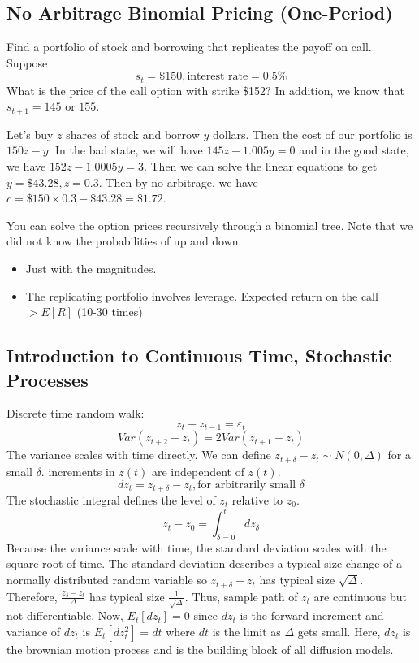 \documentclass[11pt, a4paper, oneside]{article}
\theoremstyle{definition}
\theoremstyle{proposition}
\theoremstyle{corollary}
\theoremstyle{lemma}
\theoremstyle{theorem}
\begin{document}
 \subsection{No Arbitrage Binomial Pricing (One-Period)}
 Find a portfolio of stock and borrowing that replicates the payoff on call. 
 Suppose 
 $$s_t = \$150, \text{interest rate} = 0.5\%$$
 What is the price of the call option with strike \$152? In addition, we know that $s_{t+1} = 145 \text{ or } 155$. 
 
 Let's buy $z$ shares of stock and borrow $y$ dollars. Then the cost of our portfolio is $150z - y$. In the bad state, we will have $145 z - 1.005 y = 0$ and in the good state, we have $152z - 1.0005 y = 3$. Then we can solve the linear equations to get $y = \$43.28, z = 0.3$. Then by no arbitrage, we have $c = \$150\times 0.3 - \$43.28 = \$1.72$. 
 
You can solve the option prices recursively through a binomial tree. Note that we did not know the probabilities of up and down.
\begin{itemize}
\item Just with the magnitudes. 
\item The replicating portfolio involves leverage. Expected return on the call $> E[R]$ (10-30 times)
\end{itemize}

\subsection{Introduction to Continuous Time, Stochastic Processes}
 Discrete time random walk:
 $$z_t - z_{t -1} = \varepsilon_t$$
 $$Var(z_{t+2} - z_t) = 2Var(z_{t+1} - z_t)$$
 The variance scales with time directly. We can define $z_{t+\delta} - z_t \sim N(0, \Delta)$ for a small $\delta$. increments in $z(t)$ are independent of $z(t)$. 
 $$dz_t = z_{t+\delta} - z_t, \text{for arbitrarily small } \delta$$ The stochastic integral defines the level of $z_t$ relative to $z_0$.
 $$z_t - z_0 = \int_{\delta=0}^t dz_{\delta}$$
 Because the variance scale with time, the standard deviation scales with the square root of time. The standard deviation describes a typical size change of a normally distributed random variable so $z_{t+\delta} - z_t$ has typical size $\sqrt{\Delta}$. Therefore, $\frac{z_{\delta} -z_t} {\Delta}$ has typical size $\frac{1}{\sqrt{\Delta} }$. Thus, sample path of $z_t$ are continuous but not differentiable. Now, $E_t[d z_t] = 0$ since $dz_t$ is the forward increment and variance of $dz_t$ is $E_t[dz_t^2] = dt$ where $dt$ is the limit as $\Delta$ gets small. Here, $dz_t$ is the brownian motion process and is the building block of all diffusion models. 
 
\end{document}
